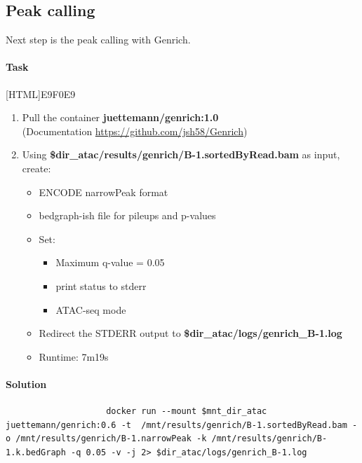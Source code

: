 \documentclass[12pt]{article}
\begin{document}
		\subsection{Peak calling}
			Next step is the peak calling with Genrich. 
			
			\paragraph{Task}
			
			[HTML]{E9F0E9}{\parbox{\linewidth}{%
					\begin{enumerate}
						\item  Pull the container  \textbf{juettemann/genrich:1.0} \\
						(Documentation  \url{https://github.com/jsh58/Genrich})
						\item Using\textbf{ \$dir\_atac/results/genrich/B-1.sortedByRead.bam} as input, create:
						\begin{itemize}
							\item ENCODE narrowPeak format
							\item bedgraph-ish file for pileups and p-values
							\item Set:
							\begin{itemize}
								\item Maximum q-value = 0.05
								\item print status to stderr
								\item ATAC-seq mode 
							\end{itemize}
							\item Redirect the STDERR output to \textbf{\$dir\_atac/logs/genrich\_B-1.log}
							\item Runtime: 7m19s
						\end{itemize}
					\end{enumerate}
			}}
			
			
			\paragraph{Solution}
				
			\begin{minipage}{\linewidth}
				\begin{lstlisting}
					docker run --mount $mnt_dir_atac juettemann/genrich:0.6 -t  /mnt/results/genrich/B-1.sortedByRead.bam -o /mnt/results/genrich/B-1.narrowPeak -k /mnt/results/genrich/B-1.k.bedGraph -q 0.05 -v -j 2> $dir_atac/logs/genrich_B-1.log
				\end{lstlisting}
			\end{minipage}
	
\end{document}
